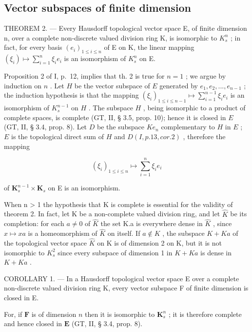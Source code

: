 \subsection{Vector subspaces of finite dimension}

THEOREM 2. --- Every Hausdorff topological vector space E, of finite dimension n, over a complete non-discrete valued division ring K, is isomorphic to \(K_{s}^{n}\) ; in fact, for every basis \((e_{i})_{1\leqslant i\leqslant n}\) of E on K, the linear mapping \((\xi_{i})\mapsto\sum_{i=1}^{n}\xi_{i}e_{i}\) is an isomorphism of \(K_{s}^{n}\) on E.

Proposition 2 of I, p.~12, implies that th. 2 is true for \(n = 1\) ; we argue by induction on \(n\) . Let \(H\) be the vector subspace of \(E\) generated by \(e_1, e_2, ..., e_{n-1}\) ; the induction hypothesis is that the mapping \((\xi_i)_{1 \leqslant i \leqslant n-1} \mapsto \sum_{i=1}^{n-1} \xi_i e_i\) is an isomorphism of \(K_s^{n-1}\) on \(H\) . The subspace \(H\) , being isomorphic to a product of complete spaces, is complete (GT, II, § 3.5, prop. 10); hence it is closed in \(E\) (GT, II, § 3.4, prop. 8). Let \(D\) be the subspace \(K e_n\) complementary to \(H\) in \(E\) ; \(E\) is the topological direct sum of \(H\) and \(D(I, p. 13, cor. 2)\) , therefore the mapping

\[
\left(\xi_ {i}\right) _ {1 \leqslant i \leqslant n} \mapsto \sum_ {i = 1} ^ {n} \xi_ {i} e _ {i}
\]

of \(\mathbf{K}_s^{n - 1}\times \mathbf{K}_s\) on E is an isomorphism.

When n \textgreater{} 1 the hypothesis that K is complete is essential for the validity of theorem 2. In fact, let K be a non-complete valued division ring, and let \(\hat{K}\) be its completion: for each \(a \neq 0\) of \(\hat{K}\) the set K.a is everywhere dense in \(\hat{K}\) , since \(x \mapsto xa\) is a homeomorphism of \(\hat{K}\) on itself. If \(a \notin K\) , the subspace \(K + Ka\) of the topological vector space \(\hat{K}\) on K is of dimension 2 on K, but it is not isomorphic to \(K_{s}^{2}\) since every subspace of dimension 1 in \(K + Ka\) is dense in \(K + Ka\) .

COROLLARY 1. --- In a Hausdorff topological vector space E over a complete non-discrete valued division ring K, every vector subspace F of finite dimension is closed in E.

For, if \(\mathbf{F}\) is of dimension \(n\) then it is isomorphic to \(\mathbf{K}_s^n\) ; it is therefore complete and hence closed in \(\mathbf{E}\) (GT, II, § 3.4, prop. 8).

